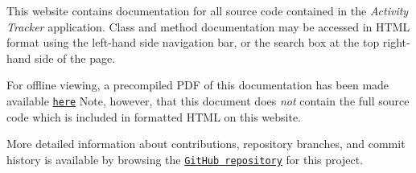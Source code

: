 This website contains documentation for all source code contained in the {\itshape Activity Tracker} application. Class and method documentation may be accessed in H\+T\+ML format using the left-\/hand side navigation bar, or the search box at the top right-\/hand side of the page.

For offline viewing, a precompiled P\+DF of this documentation has been made available \href{https://htmlboss.github.io/comp2005-activity-tracker/tex/manual.pdf}{\tt here} Note, however, that this document does {\itshape not} contain the full source code which is included in formatted H\+T\+ML on this website.

More detailed information about contributions, repository branches, and commit history is available by browsing the \href{https://github.com/htmlboss/comp2005-activity-tracker}{\tt Git\+Hub repository} for this project. 